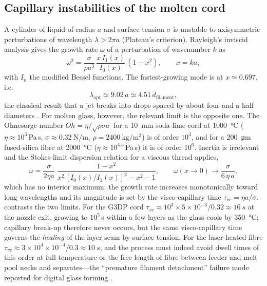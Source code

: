 \subsection{Capillary instabilities of the molten cord}
A cylinder of liquid of radius \(a\) and surface tension \(\sigma\) is unstable to axisymmetric perturbations of wavelength \(\lambda > 2\pi a\) (Plateau's criterion). Rayleigh's inviscid analysis \citep{rayleigh1878} gives the growth rate \(\omega\) of a perturbation of wavenumber \(k\) as
\begin{equation}
  \omega^{2} = \frac{\sigma}{\rho a^{3}}\, \frac{x\, I_1(x)}{I_0(x)}\,(1 - x^{2}), \qquad x = ka,
  \label{eq:rayleigh}
\end{equation}
with \(I_n\) the modified Bessel functions. The fastest-growing mode is at \(x \simeq 0.697\), i.e.
\begin{equation}
  \lambda_{\mathrm{opt}} \simeq 9.02\,a \simeq 4.51\, d_{\mathrm{filament}},
  \label{eq:lambdaopt}
\end{equation}
the classical result that a jet breaks into drops spaced by about four and a half diameters \citep{rayleigh1878,tomotika1935,wiki_plateau}. For molten glass, however, the relevant limit is the opposite one. The Ohnesorge number \(Oh = \eta/\sqrt{\rho\sigma a}\) for a \SI{10}{mm} soda-lime cord at \SI{1000}{\celsius} (\(\eta \approx 10^{3}\,\)Pa\,s, \(\sigma \approx \SI{0.32}{\newton\per\metre}\), \(\rho = \SI{2400}{\kilogram\per\cubic\metre}\)) is of order \(10^{3}\), and for a \SI{200}{\micro\metre} fused-silica fibre at \SI{2000}{\celsius} (\(\eta \approx 10^{4.5}\,\)Pa\,s) it is of order \(10^{6}\). Inertia is irrelevant and the Stokes-limit dispersion relation for a viscous thread \citep{tomotika1935} applies,
\begin{equation}
  \omega = \frac{\sigma}{2\eta a}\;\frac{1 - x^{2}}{x^{2}\,[I_0(x)/I_1(x)]^{2} - x^{2} - 1},
  \qquad \omega(x\to 0) \to \frac{\sigma}{6\,\eta\, a},
  \label{eq:tomotika}
\end{equation}
which has no interior maximum: the growth rate increases monotonically toward long wavelengths and its magnitude is set by the visco-capillary time \(\tau_{vc} = \eta a/\sigma\).  contrasts the two limits. For the G3DP cord \(\tau_{vc} \approx 10^{3}\times 5\times10^{-3}/0.32 \approx \SI{16}{s}\) at the nozzle exit, growing to \(10^{5}\)\,s within a few layers as the glass cools by \SI{350}{\celsius}; capillary break-up therefore never occurs, but the same visco-capillary time governs the \emph{healing} of the layer seam by surface tension. For the laser-heated fibre \(\tau_{vc} \approx 3\times10^{4}\times10^{-4}/0.3 \approx \SI{10}{s}\), and the process must indeed avoid dwell times of this order at full temperature or the free length of fibre between feeder and melt pool necks and separates---the ``premature filament detachment'' failure mode reported for digital glass forming \citep{dgf2026control}.


